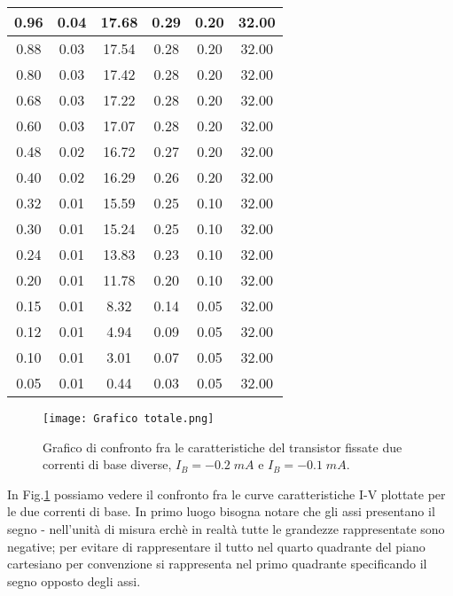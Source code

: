 \documentclass[a4paper, 11pt]{article}
\begin{document}
\begin{longtable}{|c|c|c|c|c|c|}
        0.96 & 0.04 & 17.68 & 0.29 & 0.20 & 32.00 \\
        \hline 
        0.88 & 0.03 & 17.54 & 0.28 & 0.20 & 32.00 \\
        \hline 
        0.80 & 0.03 & 17.42 & 0.28 & 0.20 & 32.00 \\
        \hline 
        0.68 & 0.03 & 17.22 & 0.28 & 0.20 & 32.00 \\
        \hline 
        0.60 & 0.03 & 17.07 & 0.28 & 0.20 & 32.00 \\
        \hline 
        0.48 & 0.02 & 16.72 & 0.27 & 0.20 & 32.00 \\
        \hline 
        0.40 & 0.02 & 16.29 & 0.26 & 0.20 & 32.00 \\
        \hline 
        0.32 & 0.01 & 15.59 & 0.25 & 0.10 & 32.00 \\
        \hline 
        0.30 & 0.01 & 15.24 & 0.25 & 0.10 & 32.00 \\
        \hline 
        0.24 & 0.01 & 13.83 & 0.23 & 0.10 & 32.00 \\
        \hline 
        0.20 & 0.01 & 11.78 & 0.20 & 0.10 & 32.00 \\
        \hline 
        0.15 & 0.01 & 8.32 & 0.14 & 0.05 & 32.00 \\
        \hline 
        0.12 & 0.01 & 4.94 & 0.09 &	0.05 & 32.00 \\
        \hline 
        0.10 & 0.01 & 3.01 & 0.07 &	0.05 & 32.00 \\
        \hline 
        0.05 & 0.01 & 0.44 & 0.03 &	0.05 & 32.00 \\
        \hline 
\end{longtable}

\begin{figure}[!htb]
    \centering
    \texttt{[image: Grafico totale.png]}
    \caption{Grafico di confronto fra le caratteristiche del transistor fissate due correnti di base diverse, $I_B = -0.2 \;mA $ e $I_B = -0.1 \;mA$.}
    \label{fig:g-tot}
\end{figure}

In Fig.\ref{fig:g-tot} possiamo vedere il confronto fra le curve caratteristiche I-V plottate per le due correnti di base. In primo luogo bisogna notare che gli assi presentano il segno - nell'unità di misura erchè in realtà tutte le grandezze rappresentate sono negative; per evitare di rappresentare il tutto nel quarto quadrante del piano cartesiano per convenzione si rappresenta nel primo quadrante specificando il segno opposto degli assi. 
\end{document}
